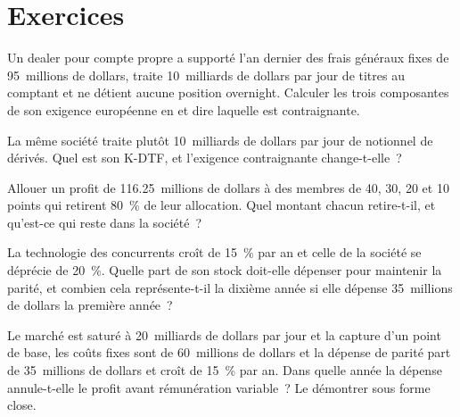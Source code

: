 \section{Exercices}

\begin{exercise}[$\star$]\label{exo:fm:the-proprietary-market-making-firm:1}
Un dealer pour compte propre a supporté l'an dernier des frais généraux fixes de 95~millions de dollars, traite 10~milliards de dollars par jour de titres au comptant et ne détient aucune
position overnight. Calculer les trois composantes de son exigence européenne en  et dire laquelle est contraignante.
\end{exercise}

\begin{exercise}[$\star$]\label{exo:fm:the-proprietary-market-making-firm:2}
La même société traite plutôt 10~milliards de dollars par jour de notionnel de dérivés. Quel est son K-DTF, et l'exigence contraignante change-t-elle~?
\end{exercise}

\begin{exercise}[$\star$]\label{exo:fm:the-proprietary-market-making-firm:3}
Allouer un profit de 116.25~millions de dollars à des membres de 40, 30, 20 et 10 points qui retirent 80~\% de leur allocation. Quel montant chacun retire-t-il, et
qu'est-ce qui reste dans la société~?
\end{exercise}

\begin{exercise}[$\star\star$]\label{exo:fm:the-proprietary-market-making-firm:4}
La technologie des concurrents croît de 15~\% par an et celle de la société se déprécie de 20~\%. Quelle part de son stock doit-elle dépenser pour maintenir la parité, et combien
cela représente-t-il la dixième année si elle dépense 35~millions de dollars la première année~?
\end{exercise}

\begin{exercise}[$\star\star$]\label{exo:fm:the-proprietary-market-making-firm:5}
Le marché est saturé à 20~milliards de dollars par jour et la capture d'un point de base, les coûts fixes sont de 60~millions de dollars et la dépense de parité part de 35~millions de dollars
et croît de 15~\% par an. Dans quelle année la dépense annule-t-elle le profit avant rémunération variable~? Le démontrer sous forme close.
\end{exercise}

